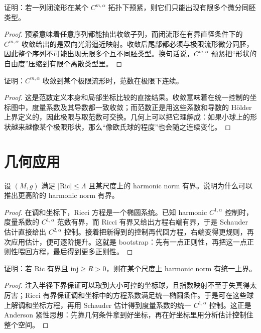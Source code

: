 \documentclass[11pt,a4paper,openany]{ctexbook}
\numberwithin{equation}{chapter}
\begin{document}
\begin{problem}
证明：若一列闭流形在某个 \(C^{m,\alpha}\) 拓扑下预紧，则它们只能出现有限多个微分同胚类型。
\end{problem}
\begin{proof}
预紧意味着任意序列都能抽出收敛子列，而闭流形在有界直径条件下的 \(C^{m,\alpha}\) 收敛给出的是双向光滑逼近映射。收敛后尾部都必须与极限流形微分同胚，因此整个序列不可能出现无限多个互不同胚类型。换句话说，\(C^{m,\alpha}\) 预紧把“形状的自由度”压缩到有限个离散类型里。  
\end{proof}

\begin{problem}
证明：\(C^{m,\alpha}\) 收敛到某个极限流形时，范数在极限下连续。
\end{problem}
\begin{proof}
这是范数定义本身和局部坐标比较的直接结果。收敛意味着在统一控制的坐标图中，度量系数及其导数都一致收敛；而范数正是用这些系数和导数的 Hölder 上界定义的，因此极限与取范数可交换。几何上可以把它理解成：如果小球上的形状越来越像某个极限形状，那么“像欧氏球的程度”也会随之连续变化。  
\end{proof}

\section{几何应用}

\begin{problem}
设 \((M,g)\) 满足 \(|\mathrm{Ric}|\le \Lambda\) 且某尺度上的 harmonic norm 有界。说明为什么可以推出更高阶的 harmonic norm 有界。
\end{problem}
\begin{proof}
在调和坐标下，Ricci 方程是一个椭圆系统。已知 harmonic \(C^{1,\alpha}\) 控制时，度量系数的 \(C^{1,\alpha}\) 范数有界，而 Ricci 有界又给出方程右端有界，于是 Schauder 估计直接给出 \(C^{2,\alpha}\) 控制。接着把新得到的控制再代回方程，右端变得更规则，再次应用估计，便可逐阶提升。这就是 bootstrap：先有一点正则性，再把这一点正则性喂回方程，最后得到更多正则性。  
\end{proof}

\begin{problem}
证明：若 \(\mathrm{Ric}\) 有界且 \(\mathrm{inj}\ge R>0\)，则在某个尺度上 harmonic norm 有统一上界。
\end{problem}
\begin{proof}
注入半径下界保证可以取到大小可控的坐标球，且指数映射不至于失真得太厉害；Ricci 有界保证调和坐标中的方程系数满足统一椭圆条件。于是可在这些球上解调和坐标方程，再用 Schauder 估计得到度量系数的统一 \(C^{1,\alpha}\) 控制。这正是 Anderson 紧性思想：先靠几何条件拿到好坐标，再在好坐标里用分析估计控制住整个空间。  
\end{proof}
\end{document}
